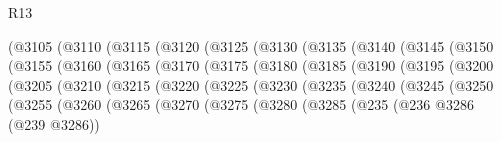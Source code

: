 \begin{lexlean}{R13}
\begin{coremodule}
                (@3105
                  (@3110
                    (@3115
                      (@3120
                        (@3125
                          (@3130
                            (@3135
                              (@3140
                                (@3145
                                  (@3150
                                    (@3155
                                      (@3160
                                        (@3165
                                          (@3170
                                            (@3175
                                              (@3180
                                                (@3185
                                                  (@3190
                                                    (@3195
                                                      (@3200
                                                        (@3205
                                                          (@3210
                                                            (@3215
                                                              (@3220
                                                                (@3225
                                                                  (@3230
                                                                    (@3235
                                                                      (@3240
                                                                        (@3245
                                                                          (@3250
                                                                            (@3255
                                                                              (@3260
                                                                                (@3265
                                                                                  (@3270
                                                                                    (@3275
                                                                                      (@3280
                                                                                        (@3285
                                                                                          (@235
                                                                                            (@236
                                                                                              @3286
                                                                                              (@239
                                                                                                @3286))

\end{coremodule}
\end{lexlean}
